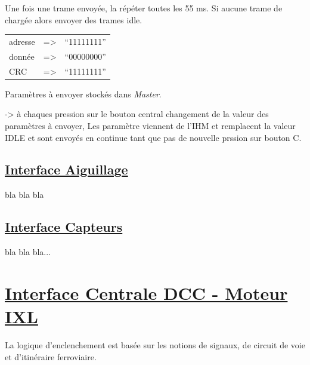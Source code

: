 \medskip
Une fois une trame envoyée, la répéter toutes les 55 ms. Si aucune
trame de chargée alors envoyer des trames idle.

\medskip
\begin{center}
\begin{tabular}{lll}
adresse & => & ``11111111'' \\
donnée  & => & ``00000000'' \\
CRC     & => & ``11111111'' \\
\end{tabular}
\end{center}

\medskip
Paramètres à envoyer stockés dans \emph{Master}.


-> à chaques pression sur le bouton central changement de la valeur
des paramètres à envoyer, Les paramètre viennent de l'IHM et
remplacent la valeur IDLE et sont envoyés en continue tant que pas de
nouvelle prssion sur bouton C.

\bigskip
\subsection{\underline{Interface Aiguillage}}
\label{sec:int_aig}

bla bla bla

\subsection{\underline{Interface Capteurs}}
\label{sec:int_cap}

bla bla bla...


\newpage
\section{\underline{Interface Centrale DCC - Moteur IXL}}
\label{sec:int_ixl}   

La logique d'enclenchement est basée sur les notions de signaux, de
circuit de voie et d'itinéraire ferroviaire.

